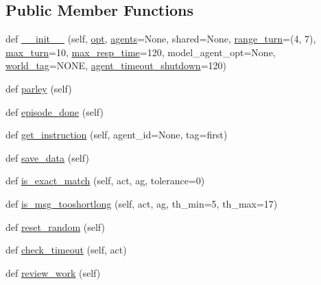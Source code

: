 \subsection*{Public Member Functions}
\begin{DoxyCompactItemize}
\item 
def \hyperlink{classworlds_1_1PersonaChatEvalWorld_ace0551d69c1746044a8de84a6fdd071e}{\+\_\+\+\_\+init\+\_\+\+\_\+} (self, \hyperlink{classparlai_1_1core_1_1worlds_1_1World_a3640d92718acd3e6942a28c1ab3678bd}{opt}, \hyperlink{classparlai_1_1core_1_1worlds_1_1MultiAgentDialogWorld_a05fc93525cb86edef121980fc55f9926}{agents}=None, shared=None, \hyperlink{classworlds_1_1PersonaChatEvalWorld_a665a0c88898bbe31d1a1a8ba461c9429}{range\+\_\+turn}=(4, 7), \hyperlink{classworlds_1_1PersonaChatEvalWorld_a2b2a7c4efd28d2fd2efd663bc3fcef1e}{max\+\_\+turn}=10, \hyperlink{classworlds_1_1PersonaChatEvalWorld_a4a9cb91f5422986e69790c7302c952bf}{max\+\_\+resp\+\_\+time}=120, model\+\_\+agent\+\_\+opt=None, \hyperlink{classworlds_1_1PersonaChatEvalWorld_ae597e51544be2476539c075e6ea0bcad}{world\+\_\+tag}=\textquotesingle{}N\+O\+NE\textquotesingle{}, \hyperlink{classworlds_1_1PersonaChatEvalWorld_aee0fa9efee57a370499a0691950b548b}{agent\+\_\+timeout\+\_\+shutdown}=120)
\item 
def \hyperlink{classworlds_1_1PersonaChatEvalWorld_ac72940bb2474528d1cc51661d4db3b85}{parley} (self)
\item 
def \hyperlink{classworlds_1_1PersonaChatEvalWorld_a70142e8e89b6d07916c7e5d7428f9d0c}{episode\+\_\+done} (self)
\item 
def \hyperlink{classworlds_1_1PersonaChatEvalWorld_ab3dd599a36597f672da5d54654a0266e}{get\+\_\+instruction} (self, agent\+\_\+id=None, tag=\textquotesingle{}first\textquotesingle{})
\item 
def \hyperlink{classworlds_1_1PersonaChatEvalWorld_a854ebcf8c0781f58a296fde2c7db80c9}{save\+\_\+data} (self)
\item 
def \hyperlink{classworlds_1_1PersonaChatEvalWorld_a89e55508c048d8da3aba513b94b9a684}{is\+\_\+exact\+\_\+match} (self, act, ag, tolerance=0)
\item 
def \hyperlink{classworlds_1_1PersonaChatEvalWorld_a3968b6677767a53dab21e828a8b575a6}{is\+\_\+msg\+\_\+tooshortlong} (self, act, ag, th\+\_\+min=5, th\+\_\+max=17)
\item 
def \hyperlink{classworlds_1_1PersonaChatEvalWorld_a74d31d5c4581214ceebabfaf7d48f793}{reset\+\_\+random} (self)
\item 
def \hyperlink{classworlds_1_1PersonaChatEvalWorld_a8c2ba6e0dc082cf9e53cfd70e2d71e4b}{check\+\_\+timeout} (self, act)
\item 
def \hyperlink{classworlds_1_1PersonaChatEvalWorld_aaba9e31d1918785215499ddaadf8a91d}{review\+\_\+work} (self)
\end{DoxyCompactItemize}

